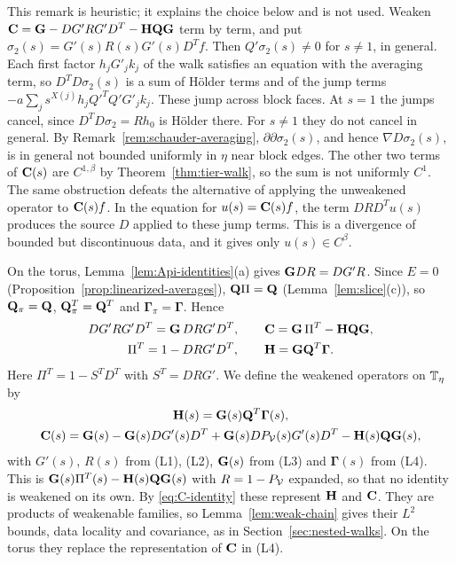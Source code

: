 \begin{remark}\label{rem:C-formula}
This remark is heuristic; it explains the choice below and is not used. Weaken $\mathbf C=\mathbf G-DG'RG'D^T-\mathbf H\mathbf Q\mathbf G$ term by term, and put $\sigma_2(s)=G'(s)R(s)G'(s)D^Tf$. Then $Q'\sigma_2(s)\ne0$ for $s\ne1$, in general. Each first factor $h_jG'_jk_j$ of the walk satisfies an equation with the averaging term, so $D^TD\sigma_2(s)$ is a sum of H\"older terms and of the jump terms $-a\sum_js^{X(j)}h_jQ'^TQ'G'_jk_j$. These jump across block faces. At $s=1$ the jumps cancel, since $D^TD\sigma_2=Rh_0$ is H\"older there. For $s\ne1$ they do not cancel in general. By Remark~\ref{rem:schauder-averaging}, $\partial\partial\sigma_2(s)$, and hence $\nabla D\sigma_2(s)$, is in general not bounded uniformly in $\eta$ near block edges. The other two terms of $\mathbf C(s)$ are $C^{1,\beta}$ by Theorem~\ref{thm:tier-walk}, so the sum is not uniformly $C^1$. The same obstruction defeats the alternative of applying the unweakened operator to $\mathbf C(s)f$. In the equation for $u(s)=\mathbf C(s)f$, the term $DRD^Tu(s)$ produces the source $D$ applied to these jump terms. This is a divergence of bounded but discontinuous data, and it gives only $u(s)\in C^\beta$.
\end{remark}

On the torus, Lemma~\ref{lem:Api-identities}(a) gives $\mathbf G DR=DG'R$. Since $E=0$ (Proposition~\ref{prop:linearized-averages}), $\mathbf Q\Pi=\mathbf Q$ (Lemma~\ref{lem:slice}(c)), so $\mathbf Q_\pi=\mathbf Q$, $\mathbf Q_\pi^T=\mathbf Q^T$ and $\boldsymbol\Gamma_\pi=\boldsymbol\Gamma$. Hence
\begin{equation}\label{eq:C-identity}
\begin{gathered}
DG'RG'D^T=\mathbf G\,DRG'D^T,\qquad\mathbf C=\mathbf G\,\Pi^T-\mathbf H\mathbf Q\mathbf G,\\
\Pi^T=1-DRG'D^T,\qquad\mathbf H=\mathbf G\mathbf Q^T\boldsymbol\Gamma .
\end{gathered}
\end{equation}
Here $\Pi^T=1-S^TD^T$ with $S^T=DRG'$. We define the weakened operators on $\mathbb T_\eta$ by
\[
\begin{gathered}
\mathbf H(s)=\mathbf G(s)\mathbf Q^T\boldsymbol\Gamma(s),\\
\mathbf C(s)=\mathbf G(s)-\mathbf G(s)DG'(s)D^T+\mathbf G(s)DP_\mathcal V(s)G'(s)D^T-\mathbf H(s)\mathbf Q\mathbf G(s),
\end{gathered}
\]
with $G'(s)$, $R(s)$ from (L1), (L2), $\mathbf G(s)$ from (L3) and $\boldsymbol\Gamma(s)$ from (L4). This is $\mathbf G(s)\Pi^T(s)-\mathbf H(s)\mathbf Q\mathbf G(s)$ with $R=1-P_\mathcal V$ expanded, so that no identity is weakened on its own. By \eqref{eq:C-identity} these represent $\mathbf H$ and $\mathbf C$. They are products of weakenable families, so Lemma~\ref{lem:weak-chain} gives their $L^2$ bounds, data locality and covariance, as in Section~\ref{sec:nested-walks}. On the torus they replace the representation of $\mathbf C$ in (L4).

